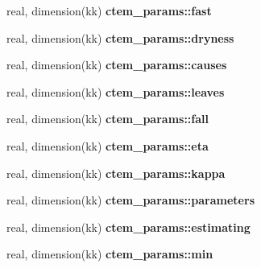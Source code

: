 \begin{DoxyCompactItemize}
\item 
\hypertarget{namespacectem__params_a495c379a43cf9ffbbaf38ed0b9d42f9a}{}real, dimension(kk) {\bfseries ctem\+\_\+params\+::fast}\label{namespacectem__params_a495c379a43cf9ffbbaf38ed0b9d42f9a}

\item 
\hypertarget{namespacectem__params_ad8b4467ba6c3f7d4bdd3cfa2218d9532}{}real, dimension(kk) {\bfseries ctem\+\_\+params\+::dryness}\label{namespacectem__params_ad8b4467ba6c3f7d4bdd3cfa2218d9532}

\item 
\hypertarget{namespacectem__params_a2d3ff91a317be0e6e55f48995329f683}{}real, dimension(kk) {\bfseries ctem\+\_\+params\+::causes}\label{namespacectem__params_a2d3ff91a317be0e6e55f48995329f683}

\item 
\hypertarget{namespacectem__params_a6f65f0079a4f07810c74d81e7090352f}{}real, dimension(kk) {\bfseries ctem\+\_\+params\+::leaves}\label{namespacectem__params_a6f65f0079a4f07810c74d81e7090352f}

\item 
\hypertarget{namespacectem__params_ad92b9ebe632ca08f47881e71e1f32c9f}{}real, dimension(kk) {\bfseries ctem\+\_\+params\+::fall}\label{namespacectem__params_ad92b9ebe632ca08f47881e71e1f32c9f}

\item 
\hypertarget{namespacectem__params_af316f76bee6244c68e937ed9e399bbd0}{}real, dimension(kk) {\bfseries ctem\+\_\+params\+::eta}\label{namespacectem__params_af316f76bee6244c68e937ed9e399bbd0}

\item 
\hypertarget{namespacectem__params_a31cd33c14ab64d6e347e8fa8649c0ac8}{}real, dimension(kk) {\bfseries ctem\+\_\+params\+::kappa}\label{namespacectem__params_a31cd33c14ab64d6e347e8fa8649c0ac8}

\item 
\hypertarget{namespacectem__params_a9993d9a038bf0a6f67b07ce0b8fdb682}{}real, dimension(kk) {\bfseries ctem\+\_\+params\+::parameters}\label{namespacectem__params_a9993d9a038bf0a6f67b07ce0b8fdb682}

\item 
\hypertarget{namespacectem__params_a858b993b539661eeab2834c94e1432ee}{}real, dimension(kk) {\bfseries ctem\+\_\+params\+::estimating}\label{namespacectem__params_a858b993b539661eeab2834c94e1432ee}

\item 
\hypertarget{namespacectem__params_a4768c48df4cbc8bd10ce6a7c75f55b1d}{}real, dimension(kk) {\bfseries ctem\+\_\+params\+::min}\label{namespacectem__params_a4768c48df4cbc8bd10ce6a7c75f55b1d}


\end{DoxyCompactItemize}
